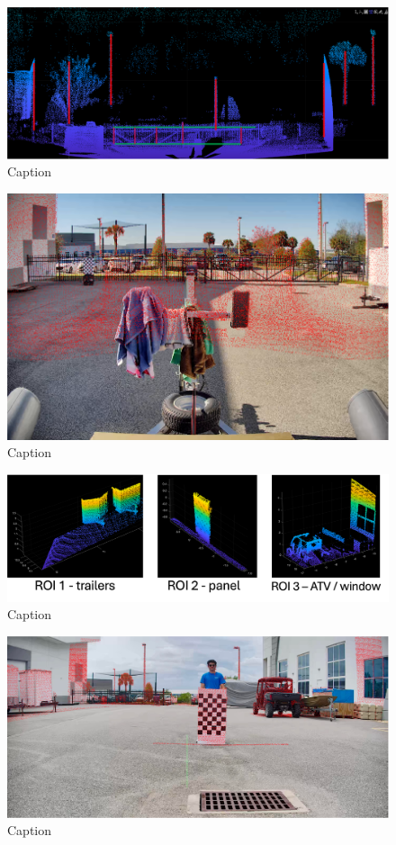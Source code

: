 \documentclass{erauthesis}
\begin{document}
\begin{figure}[htbp]
    \centering
    \includegraphics[width=0.8\linewidth]{Images/LiDAR_features.png}
    \caption{Caption}
    \label{fig:LiDAR_features}
\end{figure}


\begin{figure}[htbp]
    \centering
    \includegraphics[width=0.8\linewidth]{Images/LiDAR_overlay.png}
    \caption{Caption}
    \label{fig:LiDAR_overlay}
\end{figure}

\begin{figure}[htbp]
    \centering
    \includegraphics[width=0.8\linewidth]{Images/LiDAR_overlay3A.png}
    \caption{Caption}
    \label{fig:LiDAR_overlay3A}
\end{figure}

\begin{figure}[htbp]
    \centering
    \includegraphics[width=0.8\linewidth]{Images/LiDAR_overlay3B.png}
    \caption{Caption}
    \label{fig:LiDAR_overlay3B}
\end{figure}
\end{document}
